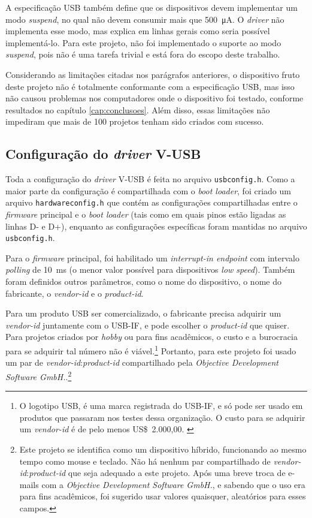 \documentclass[brazil,pagestart=firstchapter]{abnt}
\newcommand*{\VUSB}{\mbox{V-USB}\xspace}
\begin{document}
A especificação \ac{USB} também define que os dispositivos devem implementar
um modo \textit{suspend}, no qual não devem consumir mais que
\SI{500}{\micro\ampere}. \cite[cap.~2]{usbinanutshell} O \textit{driver} não
implementa esse modo, mas explica em linhas gerais como seria possível
implementá-lo. \cite[usbdrv.h]{VUSBdriver} Para este projeto, não foi
implementado o suporte ao modo \textit{suspend}, pois não é uma tarefa
trivial e está fora do escopo deste trabalho.

Considerando as limitações citadas nos parágrafos anteriores, o dispositivo
fruto deste projeto não é totalmente conformante com a especificação
\ac{USB}, mas isso não causou problemas nos computadores onde o dispositivo
foi testado, conforme resultados no capítulo \ref{cap:conclusoes}. Além
disso, essas limitações não impediram que mais de 100 projetos tenham sido
criados com sucesso. \cite{VUSBprojects}


\subsection{Configuração do \textit{driver} \VUSB}
\label{sub:vusb_config}

Toda a configuração do \textit{driver} \VUSB é feita no arquivo
\texttt{usbconfig.h}. Como a maior parte da configuração é compartilhada com
o \textit{boot loader}, foi criado um arquivo \texttt{hardwareconfig.h} que
contém as configurações compartilhadas entre o \textit{firmware} principal e
o \textit{boot loader} (tais como em quais pinos estão ligadas as linhas D-
e D+), enquanto as configurações específicas foram mantidas no arquivo
\texttt{usbconfig.h}.

Para o \textit{firmware} principal, foi habilitado um \textit{interrupt-in
endpoint} com intervalo \textit{polling} de \SI{10}{\milli\second} (o menor
valor possível para dispositivos \textit{low speed}). Também foram definidos
outros parâmetros, como o nome do dispositivo, o nome do fabricante, o
\textit{vendor-id} e o \textit{product-id}.

Para um produto \ac{USB} ser comercializado, o fabricante precisa adquirir
um \textit{vendor-id} juntamente com o \ac{USB-IF}, e pode escolher o
\textit{product-id} que quiser. Para projetos criados por \textit{hobby} ou
para fins acadêmicos, o custo e a burocracia para se adquirir tal número não
é viável.\footnote{
	O logotipo USB, é uma marca registrada do \ac{USB-IF}, e só pode ser
	usado em produtos que passaram nos testes dessa organização.
	\cite{USBlogo} O custo para se adquirir um \textit{vendor-id} é de
	pelo menos US\$~2.000,00. \cite{USBvendor}
}
Portanto, para este projeto foi usado um par de
\textit{vendor-id}:\textit{product-id} compartilhado pela \textit{Objective
Development Software GmbH.}.\footnote{
	Este projeto se identifica como um dispositivo híbrido, funcionando ao
	mesmo tempo como mouse e teclado. Não há nenhum par compartilhado de
	\textit{vendor-id}:\textit{product-id} que seja adequado a este projeto.
	\cite[USB-IDs-for-free.txt]{VUSBdriver} Após uma breve troca de e-mails
	com a \textit{Objective Development Software GmbH.}, e sabendo que o uso
	era para fins acadêmicos, foi sugerido usar valores quaisquer,
	aleatórios para esses campos.
}
\end{document}
